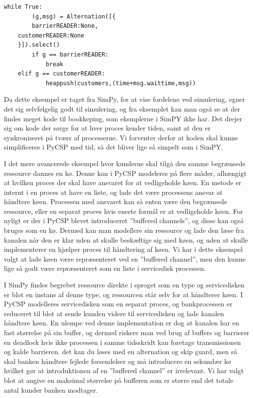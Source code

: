 \begin{lstlisting}[float=hbtp,label=bank-alternation-imp,caption=Modtage en kunde eller 
	barrier i Bankprocessen]
while True:
		(g,msg) = Alternation([{
		barrierREADER:None,
    customerREADER:None
    }]).select()
		if g == barrierREADER:
			break
    elif g == customerREADER:
			heappush(customers,(time+msg.waittime,msg))
\end{lstlisting}


Da dette eksempel er taget fra SimPy, for at vise fordelene ved simulering, egner det sig selvfølgelig godt til simulering, og fra eksemplet kan man også se at der findes meget kode til bookkeping, som eksmplerne i SimPY ikke har. Det drejer sig om kode der sørge for at hver proces kender tiden, samt at den er synkroniseret på tværs af processerne. Vi forventer derfor at koden skal kunne simplificeres i PyCSP med tid, så det bliver lige så simpelt som i SimPY.

I det mere avancerede eksempel hvor kunderne skal tilgå den samme begrænsede ressource dannes en kø. Denne kan i PyCSP modeleres på flere måder, afhængigt at hvilken proces der skal have ansvaret for at vedligeholde køen. En metode er internt i en proces at have en liste, og lade det være processens ansvar at håndtere køen. Processen med ansvaret kan så enten være den begrænsede ressource, eller en separat proces hvis eneste formål er at vedligeholde køen. For nyligt er der i PyCSP blevet introduceret ''buffered channels'', og disse kan også bruges som en kø. Dermed kan man modellere sin ressource og lade den læse fra kanalen når den er klar uden at skulle beskæftige sig med køen, og uden at skulle implementerer en hjælper proces til håndtering af køen. Vi har i dette eksempel valgt at lade køen være repræsenteret ved en ''buffered channel'', men den kunne lige så godt være repræsenteret som en liste i servicedisk processen.

I SimPy findes begrebet ressource direkte i sproget som en type og servicedisken er blot en instans af denne type, og ressourcen står selv for at håndterer køen. I PyCSP modelleres servicedisken som en separat proces, og bankprocessen er reduceret til blot at sende kunden videre til servicedisken og lade kanalen håndtere køen. En ulempe ved denne implementation er dog at kanalen har en fast størrelse på sin buffer, og dermed riskere man ved brug af buffers og barrierer en deadlock hvis ikke processen i samme tidsskridt kan foretage transmissionen og kalde barrieren. det kan du løses med en alternation og skip guard, men så skal banken håndtere fejlede forsendelser og må introducere en sekundær kø hvilket gør at introduktionen af en ''buffered channel'' er irrelevant. Vi har valgt blot at angive en maksimal størrelse på bufferen som er større end det totale antal kunder banken modtager.

